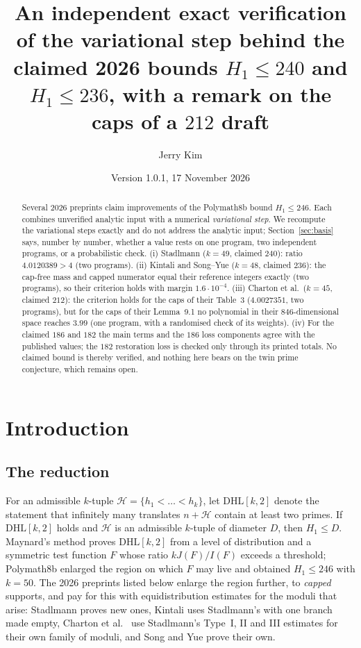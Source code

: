 \documentclass[11pt]{amsart}
\title[Verifying the variational step of the 2026 gap bounds]{An independent exact verification of the variational step behind the claimed 2026 bounds $H_1\le240$ and $H_1\le236$, with a remark on the caps of a $212$ draft}
\author{Jerry Kim}
\date{Version 1.0.1, 17 November 2026}
\theoremstyle{definition}
\theoremstyle{remark}
\newcommand{\DHL}{\mathrm{DHL}}
\begin{document}
\begin{abstract}
Several 2026 preprints claim improvements of the Polymath8b bound
$H_1\le246$. Each combines unverified analytic input with a numerical
\emph{variational step}. We recompute the variational steps exactly and do not address the analytic input; Section~\ref{sec:basis}
says, number by number, whether a value rests on one program, two independent
programs, or a probabilistic check. (i) Stadlmann ($k=49$, claimed $240$): ratio
$4.0120389>4$ (two programs). (ii) Kintali and Song--Yue ($k=48$, claimed $236$): the
cap-free mass and capped numerator equal their reference integers exactly (two
programs), so their criterion holds with margin $1.6\cdot10^{-4}$. (iii) Charton
et al.\ ($k=45$, claimed $212$): the criterion holds for the caps of their
Table~3 ($4.0027351$, two programs), but for the caps of their Lemma~9.1 no
polynomial in their $846$-dimensional space reaches $3.99$ (one program, with
a randomised check of its weights). (iv) For the claimed $186$ and $182$ the
main terms and the $186$ loss components agree with the published values; the
$182$ restoration loss is checked only through its printed totals. No claimed bound is thereby
verified, and nothing here bears on the twin prime conjecture, which remains
open.
\end{abstract}

\maketitle
\setcounter{tocdepth}{1}
\tableofcontents

\section{Introduction}

\subsection*{The reduction}
For an admissible $k$-tuple $\mathcal H=\{h_1<\dots<h_k\}$, let $\DHL[k,2]$
denote the statement that infinitely many translates $n+\mathcal H$ contain at
least two primes. If $\DHL[k,2]$ holds and $\mathcal H$ is an admissible
$k$-tuple of diameter $D$, then $H_1\le D$. Maynard's method \cite{May15}
proves $\DHL[k,2]$ from a level of distribution and a symmetric test function
$F$ whose ratio $kJ(F)/I(F)$ exceeds a threshold; Polymath8b \cite{Pol14b}
enlarged the region on which $F$ may live and obtained $H_1\le246$ with
$k=50$. The 2026 preprints listed below enlarge the region further, to
\emph{capped} supports, and pay for this with equidistribution estimates
for the moduli that arise: Stadlmann \cite{Sta26} proves new ones, Kintali
\cite{Kin26} uses Stadlmann's \cite[Prop.~3]{Sta26} with one branch made empty,
Charton et al.\ \cite{Cha26} use Stadlmann's Type~I, II and III estimates for
their own family of moduli, and Song and Yue \cite{SY26} prove their own.
\end{document}
